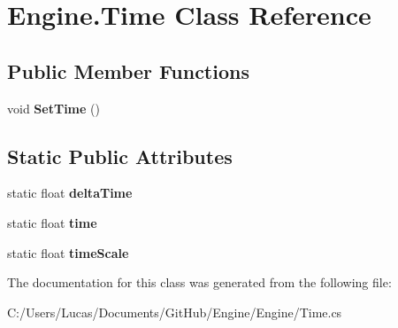 \hypertarget{class_engine_1_1_time}{\section{Engine.\-Time Class Reference}
\label{class_engine_1_1_time}
}
\subsection*{Public Member Functions}
\begin{DoxyCompactItemize}
\item 
\hypertarget{class_engine_1_1_time_a15cc5312dcb01679d280001497fa21a7}{void {\bfseries Set\-Time} ()}\label{class_engine_1_1_time_a15cc5312dcb01679d280001497fa21a7}

\end{DoxyCompactItemize}
\subsection*{Static Public Attributes}
\begin{DoxyCompactItemize}
\item 
\hypertarget{class_engine_1_1_time_aa566463719be155d3405e2f46efacf25}{static float {\bfseries delta\-Time}}\label{class_engine_1_1_time_aa566463719be155d3405e2f46efacf25}

\item 
\hypertarget{class_engine_1_1_time_a630c0fa2ce5f749c982b64e0714aa969}{static float {\bfseries time}}\label{class_engine_1_1_time_a630c0fa2ce5f749c982b64e0714aa969}

\item 
\hypertarget{class_engine_1_1_time_a0917a7d3431d9e6d0a12ee8556cf373b}{static float {\bfseries time\-Scale}}\label{class_engine_1_1_time_a0917a7d3431d9e6d0a12ee8556cf373b}

\end{DoxyCompactItemize}


The documentation for this class was generated from the following file\-:\begin{DoxyCompactItemize}
\item 
C\-:/\-Users/\-Lucas/\-Documents/\-Git\-Hub/\-Engine/\-Engine/Time.\-cs\end{DoxyCompactItemize}
